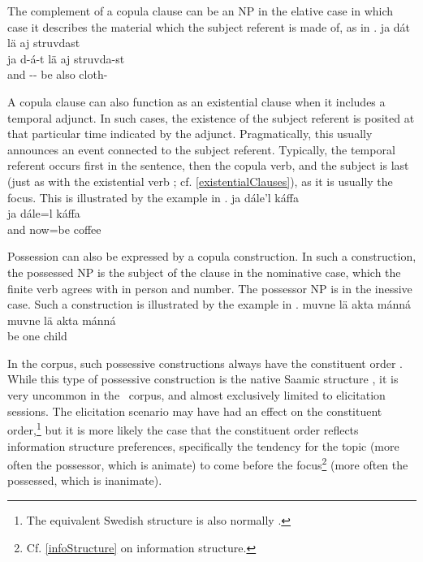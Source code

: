 The complement of a copula clause can be an NP in the elative case in which case it describes the material which the subject referent is made of, as in .
\ea\label{copula5}
\glll	ja dát lä aj struvdast\\
	ja d-á-t lä aj struvda-st\\
	and -- be\BS{} also cloth-\\\nopagebreak
{} 
\z

A copula clause can also function as an existential clause when it includes a temporal adjunct. In such cases, the existence of the subject referent is posited at that particular time indicated by the adjunct. Pragmatically, this usually announces an event connected to the subject referent. Typically, the temporal referent occurs first in the sentence, then the copula verb, and the subject is last (just as with the existential verb ; cf. \SEC\ref{existentialClauses}), as it is usually the focus. 
This is illustrated by the example in .
\ea\label{copulaNr}
\glll	ja dále'l káffa\\
	ja dále=l káffa\\
	and now=be\BS{} coffee\BS{}\\\nopagebreak
{} 
\z

Possession can also be expressed by a copula construction. In such a construction, the possessed NP is the subject of the clause in the nominative case, which the finite verb agrees with in person and number. The possessor NP is in the inessive case. Such a construction is illustrated by the example in .
\ea\label{copula6}
\glll	muvne lä akta mánná\\
	muvne lä akta mánná\\
	 be\BS{} one child\BS{}\\\nopagebreak
{} 
\z

In the corpus, such possessive constructions always have the constituent order 
\PLUS{}\PLUS{}. 
While this type of possessive construction is the native Saamic structure \citep[9]{Bergsland1977}, it is very uncommon in the \PS\ corpus, and almost exclusively limited to elicitation sessions. The elicitation scenario may have had an effect on the constituent order,\footnote{The equivalent Swedish structure is also normally .} 
but it is more likely the case that the constituent order reflects information structure preferences, specifically the tendency for the topic (more often the possessor, which is animate) to come before the focus\footnote{Cf. \SEC\ref{infoStructure} on information structure.} 
(more often the possessed, which is inanimate). 

